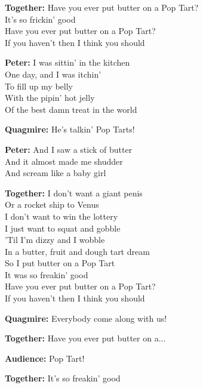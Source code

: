\vspace{10pt}
\textbf{Together:} Have you ever put butter on a Pop Tart?\\
It's so frickin' good\\
Have you ever put butter on a Pop Tart?\\
If you haven't then I think you should\par
\vspace{10pt}
\textbf{Peter:} I was sittin' in the kitchen\\
One day, and I was itchin'\\
To fill up my belly\\
With the pipin' hot jelly\\
Of the best damn treat in the world\par
\vspace{10pt}
\textbf{Quagmire:} He's talkin' Pop Tarts!\par
\vspace{10pt}
\textbf{Peter:} And I saw a stick of butter\\
And it almost made me shudder\\
And scream like a baby girl\par
\vspace{10pt}
\textbf{Together:} I don't want a giant penis\\
Or a rocket ship to Venus\\
I don't want to win the lottery\\
I just want to squat and gobble\\
'Til I'm dizzy and I wobble\\
In a butter, fruit and dough tart dream\\
So I put butter on a Pop Tart\\
It was so freakin' good\\
Have you ever put butter on a Pop Tart?\\
If you haven't then I think you should\par
\vspace{10pt}
\textbf{Quagmire:} Everybody come along with us!\par
\vspace{10pt}
\textbf{Together:} Have you ever put butter on a...\par
\vspace{10pt}
\textbf{Audience:} Pop Tart!\par
\vspace{10pt}
\textbf{Together:} It's so freakin' good\par
